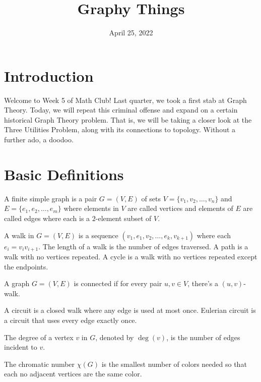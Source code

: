 \documentclass{article}
\title{Graphy Things}
\author{}
\date{April 25, 2022}
\begin{document}
\section{Introduction}
Welcome to Week 5 of Math Club! Last quarter, we took a first stab at Graph Theory. Today, we will repeat this criminal offense and expand on a certain historical Graph Theory problem. That is, we will be taking a closer look at the Three Utilities Problem, along with its connections to topology. Without a further ado, a doodoo.

\section{Basic Definitions} 
\begin{definition}
A finite simple graph is a pair $G = (V, E)$ of sets $V = \{v_{1}, v_{2}, \ldots, v_{n}\}$ and $E = \{e_{1}, e_{2}, \ldots, e_{m}\}$ where elements in $V$ are called vertices and elements of $E$ are called edges where each is a $2$-element subset of $V$. 
\end{definition}

\begin{definition}
A walk in $G = (V, E)$ is a sequence $(v_{1}, e_{1}, v_{2}, \ldots, e_{k}, v_{k + 1})$ where each $e_{i} = v_{i}v_{i + 1}$. The length of a walk is the number of edges traversed. A path is a walk with no vertices repeated. A cycle is a walk with no vertices repeated except the endpoints.
\end{definition}

\begin{definition}
A graph $G = (V, E)$ is connected if for every pair $u, v \in V$, there's a $(u, v)$-walk. 
\end{definition}

\begin{definition}
A circuit is a closed walk where any edge is used at most once. Eulerian circuit is a circuit that uses every edge exactly once. 
\end{definition}

\begin{definition}
The degree of a vertex $v$ in $G$, denoted by $\deg(v)$, is the number of edges incident to $v$. 
\end{definition}

\begin{definition}
The chromatic number $\chi(G)$ is the smallest number of colors needed so that each no adjacent vertices are the same color.
\end{definition}
\end{document}
